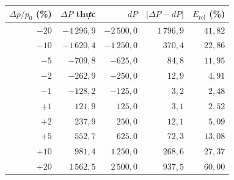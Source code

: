 
\begin{tabular}{@{}rrrrr@{}}
\toprule
$\Delta p/p_0$ (\%) & $\Delta P$ thực & $dP$ & $|\Delta P-dP|$ & $E_{\mathrm{rel}}$ (\%) \\
\midrule
${-}20$ & ${-}4\,296{,}9$ & ${-}2\,500{,}0$ & $1\,796{,}9$ & $41{,}82$ \\
${-}10$ & ${-}1\,620{,}4$ & ${-}1\,250{,}0$ & $370{,}4$ & $22{,}86$ \\
${-}5$ & ${-}709{,}8$ & ${-}625{,}0$ & $84{,}8$ & $11{,}95$ \\
${-}2$ & ${-}262{,}9$ & ${-}250{,}0$ & $12{,}9$ & $4{,}91$ \\
${-}1$ & ${-}128{,}2$ & ${-}125{,}0$ & $3{,}2$ & $2{,}48$ \\
${+}1$ & $121{,}9$ & $125{,}0$ & $3{,}1$ & $2{,}52$ \\
${+}2$ & $237{,}9$ & $250{,}0$ & $12{,}1$ & $5{,}09$ \\
${+}5$ & $552{,}7$ & $625{,}0$ & $72{,}3$ & $13{,}08$ \\
${+}10$ & $981{,}4$ & $1\,250{,}0$ & $268{,}6$ & $27{,}37$ \\
${+}20$ & $1\,562{,}5$ & $2\,500{,}0$ & $937{,}5$ & $60{,}00$ \\
\bottomrule
\end{tabular}
